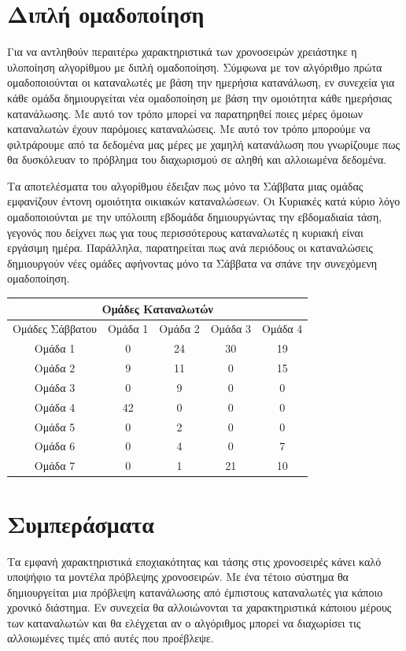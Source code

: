 \documentclass[a4paper, 11pt]{article}
\begin{document}
\section{Διπλή ομαδοποίηση}
Για να αντληθούν περαιτέρω χαρακτηριστικά των χρονοσειρών χρειάστηκε η υλοποίηση αλγορίθμου με διπλή ομαδοποίηση. Σύμφωνα με τον αλγόριθμο πρώτα ομαδοποιούνται οι καταναλωτές με βάση την ημερήσια κατανάλωση, εν συνεχεία για κάθε ομάδα δημιουργείται νέα ομαδοποίηση με βάση την ομοιότητα κάθε ημερήσιας κατανάλωσης. Με αυτό τον τρόπο μπορεί να παρατηρηθεί ποιες μέρες όμοιων καταναλωτών έχουν παρόμοιες καταναλώσεις. Με αυτό τον τρόπο μπορούμε να φιλτράρουμε από τα δεδομένα μας μέρες με χαμηλή κατανάλωση που γνωρίζουμε πως θα δυσκόλευαν το πρόβλημα του διαχωρισμού σε αληθή και αλλοιωμένα δεδομένα.

Τα αποτελέσματα του αλγορίθμου έδειξαν πως μόνο τα Σάββατα μιας ομάδας εμφανίζουν έντονη ομοιότητα οικιακών καταναλώσεων. Οι Κυριακές κατά κύριο λόγο ομαδοποιούνται με την υπόλοιπη εβδομάδα δημιουργώντας την εβδομαδιαία τάση, γεγονός που δείχνει πως για τους περισσότερους καταναλωτές η κυριακή είναι εργάσιμη ημέρα. Παράλληλα, παρατηρείται πως ανά περιόδους οι καταναλώσεις δημιουργούν νέες ομάδες αφήνοντας μόνο τα Σάββατα να σπάνε την συνεχόμενη ομαδοποίηση.

\begin{tabular}{ |c||c|c|c|c|  }
 \hline
 \multicolumn{5}{|c|}{Ομάδες Καταναλωτών} \\
 \hline
 Ομάδες Σάββατου  & Ομάδα 1& Ομάδα 2 &Ομάδα 3 &Ομάδα 4\\
 \hline
 Ομάδα 1 & 0  & 24 & 30 & 19\\
 Ομάδα 2 & 9  & 11 & 0  & 15\\
 Ομάδα 3 & 0  & 9  & 0  & 0\\
 Ομάδα 4 & 42 & 0  & 0  & 0\\
 Ομάδα 5 & 0  & 2  & 0  & 0\\
 Ομάδα 6 & 0  & 4  & 0  & 7\\
 Ομάδα 7 & 0  & 1  & 21 & 10\\
 \hline
\end{tabular}

\section{Συμπεράσματα}
Τα εμφανή χαρακτηριστικά εποχιακότητας και τάσης στις χρονοσειρές κάνει καλό υποψήφιο τα μοντέλα πρόβλεψης χρονοσειρών. Με ένα τέτοιο σύστημα θα δημιουργείται μια πρόβλεψη κατανάλωσης από έμπιστους καταναλωτές για κάποιο χρονικό διάστημα. Εν συνεχεία θα αλλοιώνονται τα χαρακτηριστικά κάποιου μέρους των καταναλωτών και θα ελέγχεται αν ο αλγόριθμος μπορεί να διαχωρίσει τις αλλοιωμένες τιμές από αυτές που προέβλεψε.
\end{document}
